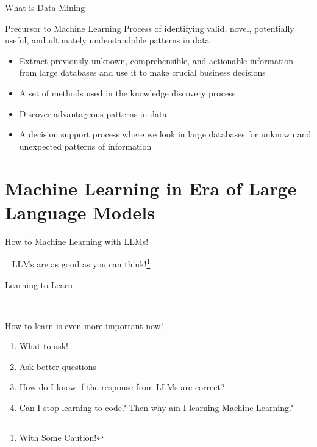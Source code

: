 \documentclass[aspectratio=169,xcolor=dvipsnames,svgnames,x11names,fleqn]{beamer}
\begin{document}
\begin{frame}{What is Data Mining}
\begin{tblock}{Precursor to Machine Learning}
Process of identifying valid, novel, potentially useful, and ultimately understandable patterns in data
\begin{itemize}
    \item<2-> Extract previously unknown, comprehensible, and actionable information from large databases and use it to make crucial business decisions
    \item<3-> A set of methods used in the knowledge discovery process
    \item<4-> Discover advantageous patterns in data
    \item<5-> A decision support process where we look in large databases
for unknown and unexpected patterns of information
\end{itemize}
\end{tblock}
\end{frame}


\section{Machine Learning in Era of Large Language Models}

\begin{frame}
    \sectionpage
\end{frame}

\begin{frame}{How to Machine Learning with LLMs!}

\begin{center}\
\huge
\color{nuaablue}
LLMs are as good as you can think!\footnote{With Some Caution!}
\end{center}
\end{frame}

\begin{frame}{Learning to Learn}

\begin{center}\

\huge

\color{nuaablue}

How to learn is even more important now! 

\large

\begin{enumerate}



\item What to ask!
\item Ask better questions
\item How do I know if the response from LLMs are correct?
\item Can I stop learning to code? Then why am I learning Machine Learning?

\end{enumerate}

\end{center}


\end{frame}
\end{document}

